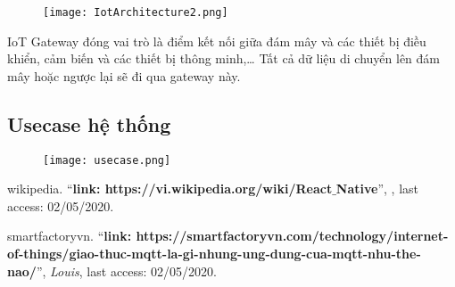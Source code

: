 \documentclass[a4paper]{article}
\begin{document}
\begin{figure}[h!]
	\begin{center}
		\texttt{[image: IotArchitecture2.png]}
	\end{center}
\end{figure}

IoT Gateway đóng vai trò là điểm kết nối giữa đám mây và các thiết bị điều khiển, cảm biến và các thiết bị thông minh,… Tất cả dữ liệu di chuyển lên đám mây hoặc ngược lại sẽ đi qua gateway này.

\newpage
\subsection{Usecase hệ thống}
\begin{figure}[h!]
	\begin{center}
		\texttt{[image: usecase.png]}
	\end{center}
\end{figure}

\begin{thebibliography}{80}


\bibitem{} wikipedia.
``\textbf{link: https://vi.wikipedia.org/wiki/React$\_$Native}'',
\textit{}, last access: 02/05/2020.

\bibitem{} smartfactoryvn.
``\textbf{link: https://smartfactoryvn.com/technology/internet-of-things/giao-thuc-mqtt-la-gi-nhung-ung-dung-cua-mqtt-nhu-the-nao/}'', \textit{Louis}, last access: 02/05/2020.

\end{thebibliography}
\end{document}
